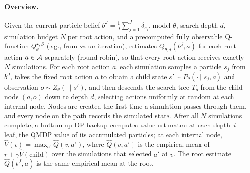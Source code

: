 \paragraph{Overview.}
Given the current particle belief $b^J=\frac{1}{J}\sum_{j=1}^J\delta_{s_j}$, model $\theta$, search depth $d$, simulation budget $N$ per root action, and a precomputed fully observable Q-function $Q_\theta^{\star,S}$ (e.g., from value iteration),  estimates $Q_{\theta,d}(b^J,a)$ for each root action $a\in{\mathcal{A}}$ separately (round-robin), so that every root action receives exactly $N$ simulations.
For each root action $a$, each simulation samples a particle $s_j$ from $b^J$, takes the fixed root action $a$ to obtain a child state $s'\sim P_\theta(\cdot\mid s_j,a)$ and observation $o\sim Z_\theta(\cdot\mid s')$, and then descends the search tree $T_a$ from the child node $(a,o)$ down to depth $d$, selecting actions uniformly at random at each internal node.
Nodes are created the first time a simulation passes through them, and every node on the path records the simulated state.
After all $N$ simulations complete, a bottom-up DP backup computes value estimates: at each depth-$d$ leaf, the QMDP value of its accumulated particles; at each internal node, $\hat V(v)=\max_{a'}\hat Q(v,a')$, where $\hat Q(v,a')$ is the empirical mean of $r+\gamma\hat V(\text{child})$ over the simulations that selected $a'$ at $v$.
The root estimate $\widehat Q(b^J,a)$ is the same empirical mean at the root.

